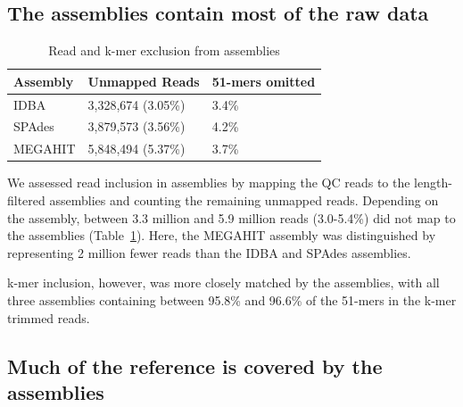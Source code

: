 \documentclass[10pt,a4paper,twocolumn]{article}
\begin{document}
\subsection*{The assemblies contain most of the raw data}



\begin{table}[!h]
\centering
\caption{Read and k-mer exclusion from assemblies}
\begin{tabular}{|p{1.5cm}|p{1.5cm}|p{2.5cm}|}\hline
  \textbf{Assembly} & \textbf{Unmapped Reads} & \textbf {51-mers omitted}
  \\ \hline
IDBA &3,328,674 (3.05\%)&  3.4\% \\ \hline
SPAdes &3,879,573 (3.56\%) &  4.2\% \\ \hline
MEGAHIT &5,848,494 (5.37\%) &   3.7\% \\ \hline
\end{tabular}
\label{table:reads-kmers}
\end{table}

We assessed read inclusion in assemblies by mapping the QC reads to
the length-filtered assemblies and counting the remaining unmapped
reads. Depending on the assembly, between 3.3 million and 5.9 million
reads (3.0-5.4\%) did not map to the assemblies
(Table~\ref{table:reads-kmers}). Here, the MEGAHIT assembly was distinguished by representing 2 million fewer reads than the IDBA and SPAdes assemblies.

k-mer inclusion, however, was more closely matched by the assemblies,
with all three assemblies containing between 95.8\% and 96.6\% of the
51-mers in the k-mer trimmed reads.



\subsection*{Much of the reference is covered by the assemblies}

\end{document}
